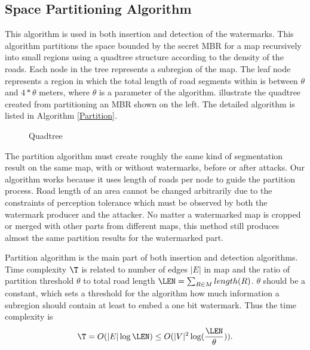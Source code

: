 \subsection{Space Partitioning Algorithm}

This algorithm is used in both insertion and detection of the watermarks. 
This algorithm partitions the space bounded by the secret MBR for a map
recursively into small regions using a quadtree structure according to the 
density of the roads. Each node in the tree represents a subregion of the map.
The leaf node represents a region in which the total length of road segments
within is between $\theta$ and $4*\theta$ meters, where $\theta$ is a parameter of the algorithm. 
 illustrate the quadtree created from partitioning an MBR
shown on the left. The detailed algorithm is listed in Algorithm \ref{Partition}.


\begin{figure}[th]
\centering
{}
\caption{Quadtree}
\label{fig:quadtree}
\end{figure}

The partition algorithm must create roughly the same kind of segmentation
result on the same map, with or without watermarks, before or after attacks.
Our algorithm works because it uses length of roads per node to guide the 
partition process. Road length of an area cannot be changed arbitrarily
due to the constraints of perception tolerance which must be observed by both
the watermark producer and the attacker. No matter a watermarked map is cropped 
or merged with other parts from different maps, this method still produces 
almost the same partition results for the watermarked part. %

Partition algorithm is the main part of both insertion
and detection algorithms. Time complexity $\T$ is related to number of edges 
$|E|$ in map and the ratio of partition threshold $\theta$ to total road length
$\LEN=\sum_{R \in M}length(R)$. $\theta$ should be a constant, which sets a threshold 
for the algorithm how much information a subregion should contain at least to embed 
a one bit watermark. Thus the time complexity is 
\[\T = O(|E|\log\LEN) \le O(|V|^2\log(\frac{\LEN}{\theta})).\]

